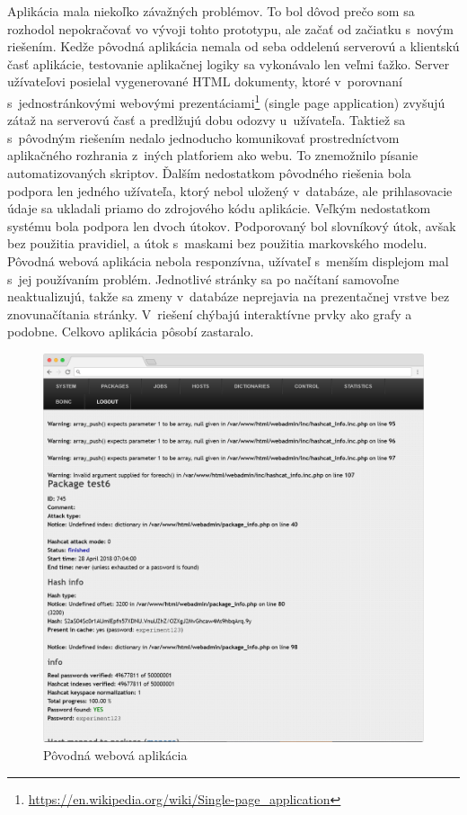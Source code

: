 \documentclass[slovak]{fitthesis}
\begin{document}
Aplikácia mala niekoľko závažných problémov. To bol dôvod prečo som sa rozhodol nepokračovať vo vývoji tohto prototypu, ale začať od začiatku s~novým riešením. Kedže pôvodná aplikácia nemala od seba oddelenú serverovú a klientskú časť aplikácie, testovanie aplikačnej logiky sa vykonávalo len veľmi ťažko. Server užívateľovi posielal vygenerované HTML dokumenty, ktoré v~porovnaní s~jednostránkovými webovými prezentáciami\footnote{\url{https://en.wikipedia.org/wiki/Single-page_application}} (single page application) zvyšujú zátaž na serverovú časť a predlžujú dobu odozvy u~užívateľa. Taktiež sa s~pôvodným riešením nedalo jednoducho komunikovať prostredníctvom aplikačného rozhrania z~iných platforiem ako webu. To znemožnilo písanie automatizovaných skriptov. Ďalším nedostatkom pôvodného riešenia bola podpora len jedného užívateľa, ktorý nebol uložený v~databáze, ale prihlasovacie údaje sa ukladali priamo do zdrojového kódu aplikácie. Veľkým nedostatkom systému bola podpora len dvoch útokov. Podporovaný bol slovníkový útok, avšak bez použitia pravidiel, a útok s~maskami bez použitia markovského modelu. Pôvodná webová aplikácia nebola responzívna, užívateľ s~menším displejom mal s~jej používaním problém. Jednotlivé stránky sa po načítaní samovoľne neaktualizujú, takže sa zmeny v~databáze neprejavia na prezentačnej vrstve bez znovunačítania stránky. V~riešení chýbajú interaktívne prvky ako grafy a podobne. Celkovo aplikácia pôsobí zastaralo.
\begin{figure}[H]
    \centering
    \includegraphics[scale=0.3]{obrazky/oldWebadmin2Frame.PNG}
    \caption{Pôvodná webová aplikácia}
    \label{fig:oldFitcrack2}
\end{figure}
\end{document}
